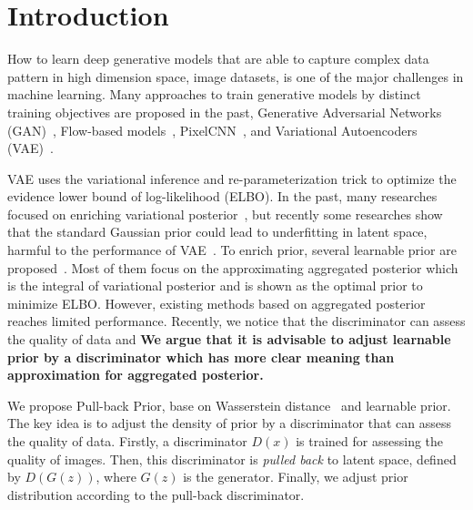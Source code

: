 \section{Introduction}

How to learn deep generative models that are able to capture complex data pattern in high dimension space, \EG image datasets, is one of the major challenges in machine learning. Many approaches to train generative models by distinct training objectives are proposed in the past, \EG Generative Adversarial Networks (GAN)~\cite{goodfellow2014generative}, Flow-based models~\cite{dinh2016density,kingma2018glow}, PixelCNN~\cite{van2016conditional}, and Variational Autoencoders (VAE)~\cite{kingma2014auto,rezende_stochastic_2014}.

VAE uses the variational inference and re-parameterization trick to optimize the evidence lower bound of log-likelihood (ELBO). In the past, many researches focused on enriching variational posterior~\cite{kingma2016improved,tomczak2016improving}, but recently some researches show that the standard Gaussian prior could lead to underfitting in latent space, harmful to the performance of VAE~\cite{tomczak2018vae}. To enrich prior, several learnable prior are proposed~\cite{tomczak2018vae,bauer2019resampled,takahashi2019variational}. Most of them focus on the approximating aggregated posterior which is the integral of variational posterior and is shown as the optimal prior to minimize ELBO. However, existing methods based on aggregated posterior reaches limited performance. Recently, we notice that the discriminator can assess the quality of data and \textbf{We argue that it is advisable to adjust learnable prior by a discriminator which has more clear meaning than approximation for aggregated posterior. }

We propose Pull-back Prior, base on Wasserstein distance~\cite{arjovsky2017wasserstein} and learnable prior. The key idea is to adjust the density of prior by a discriminator that can assess the quality of data. 
Firstly, a discriminator $D(x)$ is trained for assessing the quality of images. Then, this discriminator is \textit{pulled back} to latent space, defined by $D(G(z))$, where $G(z)$ is the generator. Finally, we adjust prior distribution according to the pull-back discriminator. 

